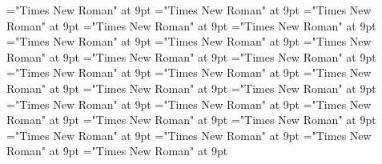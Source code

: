 \documentclass[gps1,twoside]{article}
\begin{document}
\font\scientificnamesensesensessubentrysubentriesentryafter="Times New Roman" at 9pt
\font\semanticdomainsemanticdomainsemanticdomainssensesensessubentrysubentriesentrybefore="Times New Roman" at 9pt
\font\semanticdomainssensesensessubentrysubentriesentrybefore="Times New Roman" at 9pt
\font\semanticdomainssensesensessubentrysubentriesentryafter="Times New Roman" at 9pt
\font\spanspanabbreviationsemanticdomainsemanticdomainssensesensessubentrysubentriesentrybefore="Times New Roman" at 9pt
\font\spanabbreviationsemanticdomainsemanticdomainssensesensessubentrysubentriesentrylastchildafter="Times New Roman" at 9pt
\font\spanspannamesemanticdomainsemanticdomainssensesensessubentrysubentriesentrybefore="Times New Roman" at 9pt
\font\academicdomainacademicdomainacademicdomainssensesensessubentrysubentriesentrybefore="Times New Roman" at 9pt
\font\academicdomainssensesensessubentrysubentriesentrybefore="Times New Roman" at 9pt
\font\academicdomainssensesensessubentrysubentriesentryafter="Times New Roman" at 9pt
\font\spanspanabbreviationacademicdomainacademicdomainssensesensessubentrysubentriesentrybefore="Times New Roman" at 9pt
\font\spanspannameacademicdomainacademicdomainssensesensessubentrysubentriesentrybefore="Times New Roman" at 9pt
\font\spannameacademicdomainacademicdomainssensesensessubentrysubentriesentryfirstchildbefore="Times New Roman" at 9pt
\font\spannameacademicdomainacademicdomainssensesensessubentrysubentriesentrylastchildafter="Times New Roman" at 9pt
\font\usageusageusagessensesensessubentrysubentriesentrybefore="Times New Roman" at 9pt
\font\usagessensesensessubentrysubentriesentrybefore="Times New Roman" at 9pt
\font\usagessensesensessubentrysubentriesentryafter="Times New Roman" at 9pt
\font\spanspanabbreviationusageusagessensesensessubentrysubentriesentrybefore="Times New Roman" at 9pt
\font\visiblecomplexformbackrefvisiblecomplexformbackrefvisiblecomplexformbackrefssensesensessubentrysubentriesentrybefore="Times New Roman" at 9pt
\font\visiblecomplexformbackrefssensesensessubentrysubentriesentryafter="Times New Roman" at 9pt
\font\complexformtypesvisiblecomplexformbackrefvisiblecomplexformbackrefssensesensessubentrysubentriesentryafter="Times New Roman" at 9pt
\font\spanspanreverseabbrcomplexformtypecomplexformtypesvisiblecomplexformbackrefvisiblecomplexformbackrefssensesensessubentrysubentriesentrybefore="Times New Roman" at 9pt
\font\spanspanheadwordvisiblecomplexformbackrefvisiblecomplexformbackrefssensesensessubentrysubentriesentrybefore="Times New Roman" at 9pt
\font\spanspanowningentrysummarydefinitionvisiblecomplexformbackrefvisiblecomplexformbackrefssensesensessubentrysubentriesentrybefore="Times New Roman" at 9pt
\end{document}
